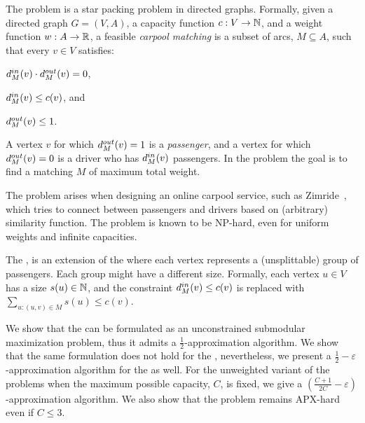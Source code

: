 The \carpool problem is a star packing problem in directed graphs.
Formally, given a directed graph $G = (V, A)$, a capacity function $c:
V \rightarrow \N$, and a weight function $w : A \rightarrow \R $, a
feasible \emph{carpool matching} is a subset of arcs, $M \subseteq A$,
such that every $v \in V$ satisfies:
\begin{inparaenum}[(i)]
\item $\din[M](v) \cdot \dout[M](v) = 0$,
\item $\din[M](v) \leq c(v)$, and 
\item $\dout[M](v) \leq 1$.
\end{inparaenum}
A vertex $v$ for which $\dout[M](v) = 1$ is a \emph{passenger}, and a
vertex for which $\dout[M](v) = 0$ is a driver who has $\din[M](v)$
passengers.  In the \carpool problem the goal is to find a matching
$M$ of maximum total weight.

The problem arises when designing an online carpool service, such as
Zimride~\cite{zimride}, which tries to connect between passengers and
drivers based on (arbitrary) similarity function.  The problem is
known to be NP-hard, even for uniform weights and infinite capacities.

The \gcp, is an extension of the \carpool where each vertex represents a
(unsplittable) group of passengers.
Each group might have a different size.  
Formally, each vertex $u \in V$ has a size $s(u) \in \N$,
and the constraint $\din(v) \leq c(v)$ is replaced with
$\sum_{u:(u,v) \in M} s(u) \leq c(v)$.  

We show that the \carpool can be formulated as an unconstrained
submodular maximization problem, thus it admits a
$\frac{1}{2}$-approximation algorithm.
We show that the same formulation does not hold for the \gcp,
nevertheless, we present a $\frac{1}{2} - \varepsilon$-approximation algorithm
for the \gcp as well.
For the unweighted variant of
the problems when the maximum possible capacity, $C$, is fixed, we give
a $(\frac{C + 1}{2C} - \varepsilon)$-approximation algorithm.
We also show that the problem remains APX-hard even if $C \leq 3$.